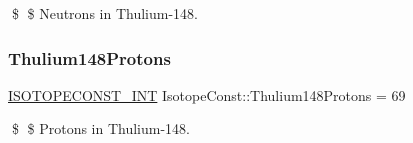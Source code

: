 \$ \$ Neutrons in Thulium-\/148. \mbox{\label{group___isotope_const-_thulium-_tm148_ga8622166a8eae54a820664b4e65a1adb5}} 
\subsubsection{\texorpdfstring{Thulium148\+Protons}{Thulium148Protons}}
{\footnotesize\ttfamily \mbox{\hyperlink{group___isotope_const-_macros_ga5f18360b3e99483a35c32d789e62621c}{I\+S\+O\+T\+O\+P\+E\+C\+O\+N\+S\+T\+\_\+\+I\+NT}} Isotope\+Const\+::\+Thulium148\+Protons = 69}

\$ \$ Protons in Thulium-\/148. 